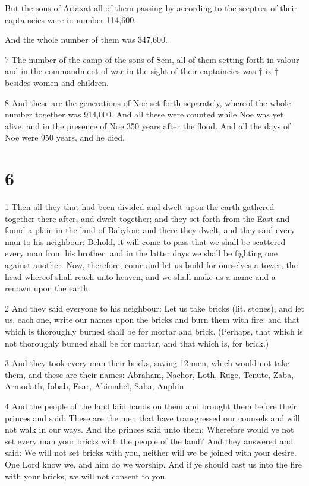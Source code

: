 \par But the sons of Arfaxat all of them passing by according to the sceptres of their captaincies were in number 114,600.

\par And the whole number of them was 347,600. 

\par 7 The number of the camp of the sons of Sem, all of them setting forth in valour and in the commandment of war in the sight of their captaincies was † ix † besides women and children.

\par 8 And these are the generations of Noe set forth separately, whereof the whole number together was 914,000. And all these were counted while Noe was yet alive, and in the presence of Noe 350 years after the flood. And all the days of Noe were 950 years, and he died.

\chapter{6}

\par 1 Then all they that had been divided and dwelt upon the earth gathered together there after, and dwelt together; and they set forth from the East and found a plain in the land of Babylon: and there they dwelt, and they said every man to his neighbour: Behold, it will come to pass that we shall be scattered every man from his brother, and in the latter days we shall be fighting one against another. Now, therefore, come and let us build for ourselves a tower, the head whereof shall reach unto heaven, and we shall make us a name and a renown upon the earth.

\par 2 And they said everyone to his neighbour: Let us take bricks (lit. stones), and let us, each one, write our names upon the bricks and burn them with fire: and that which is thoroughly burned shall be for mortar and brick. (Perhaps, that which is not thoroughly burned shall be for mortar, and that which is, for brick.)

\par 3 And they took every man their bricks, saving 12 men, which would not take them, and these are their names: Abraham, Nachor, Loth, Ruge, Tenute, Zaba, Armodath, Iobab, Esar, Abimahel, Saba, Auphin. 

\par 4 And the people of the land laid hands on them and brought them before their princes and said: These are the men that have transgressed our counsels and will not walk in our ways. And the princes said unto them: Wherefore would ye not set every man your bricks with the people of the land? And they answered and said: We will not set bricks with you, neither will we be joined with your desire. One Lord know we, and him do we worship. And if ye should cast us into the fire with your bricks, we will not consent to you. 

